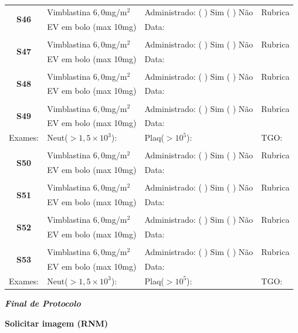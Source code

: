 \documentclass[11pt,a4paper,oldfontcommands]{memoir}
\begin{document}
\begin{center}
\begin{table}[H]
\begin{tabular}{p{}p{}|p{}|p{3cm}}
    \hline
    \multicolumn{1}{c|}{\multirow{2}{*}{\textbf{S46}}}&{Vimblastina \(6,0\)mg/m\(^2\)}&{Administrado: (  ) Sim (  ) Não}&{Rubrica}\\
    \multicolumn{1}{c|}{}&{EV em bolo (max 10mg)}&{Data:}&\\
    \hline
   \\
    \hline
    \multicolumn{1}{c|}{\multirow{2}{*}{\textbf{S47}}}&{Vimblastina \(6,0\)mg/m\(^2\)}&{Administrado: (  ) Sim (  ) Não}&{Rubrica}\\
    \multicolumn{1}{c|}{}&{EV em bolo (max 10mg)}&{Data:}&\\
    \hline
    \\
    \hline
    \multicolumn{1}{c|}{\multirow{2}{*}{\textbf{S48}}}&{Vimblastina \(6,0\)mg/m\(^2\)}&{Administrado: (  ) Sim (  ) Não}&{Rubrica}\\
    \multicolumn{1}{c|}{}&{EV em bolo (max 10mg)}&{Data:}&\\
    \hline
    \\
    \hline
    \multicolumn{1}{c|}{\multirow{2}{*}{\textbf{S49}}}&{Vimblastina \(6,0\)mg/m\(^2\)}&{Administrado: (  ) Sim (  ) Não}&{Rubrica}\\
    \multicolumn{1}{c|}{}&{EV em bolo (max 10mg)}&{Data:}&\\
    \hline
    {Exames:}&{Neut(\(>1,5\times10^3\)):}&{Plaq(\(>10^5\)):}&{TGO:}
    \\
    \hline
    \\
    \hline
    \multicolumn{1}{c|}{\multirow{2}{*}{\textbf{S50}}}&{Vimblastina \(6,0\)mg/m\(^2\)}&{Administrado: (  ) Sim (  ) Não}&{Rubrica}\\
    \multicolumn{1}{c|}{}&{EV em bolo (max 10mg)}&{Data:}&\\
    \hline
    \\
    \hline
    \multicolumn{1}{c|}{\multirow{2}{*}{\textbf{S51}}}&{Vimblastina \(6,0\)mg/m\(^2\)}&{Administrado: (  ) Sim (  ) Não}&{Rubrica}\\
    \multicolumn{1}{c|}{}&{EV em bolo (max 10mg)}&{Data:}&\\
    \hline
    \\
    \hline
    \multicolumn{1}{c|}{\multirow{2}{*}{\textbf{S52}}}&{Vimblastina \(6,0\)mg/m\(^2\)}&{Administrado: (  ) Sim (  ) Não}&{Rubrica}\\
    \multicolumn{1}{c|}{}&{EV em bolo (max 10mg)}&{Data:}&\\
    \hline
    \\
    \hline
    \multicolumn{1}{c|}{\multirow{2}{*}{\textbf{S53}}}&{Vimblastina \(6,0\)mg/m\(^2\)}&{Administrado: (  ) Sim (  ) Não}&{Rubrica}\\
    \multicolumn{1}{c|}{}&{EV em bolo (max 10mg)}&{Data:}&\\
    \hline
    {Exames:}&{Neut(\(>1,5\times10^3\)):}&{Plaq(\(>10^5\)):}&{TGO:}
    \\
   \hline
\end{tabular}
\end{table}
\textbf{\textit{Final de Protocolo}}

\textbf{Solicitar imagem (RNM)}
\end{center}
\end{document}
